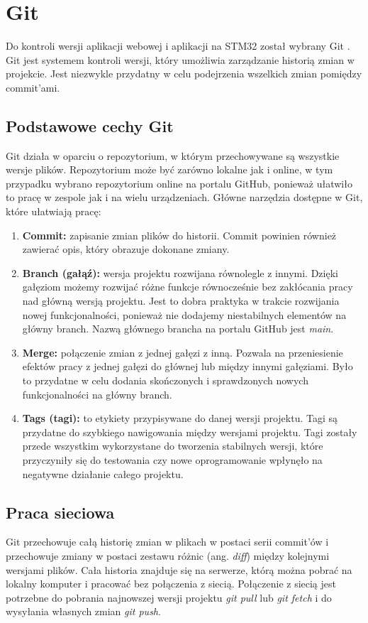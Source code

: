 \section{Git}
Do kontroli wersji aplikacji webowej i aplikacji na STM32 został wybrany Git \cite{Git}. Git jest systemem kontroli wersji, który umożliwia zarządzanie historią zmian w projekcie. Jest niezwykle przydatny w celu podejrzenia wszelkich zmian pomiędzy commit'ami.
\subsection{Podstawowe cechy Git}
Git działa w oparciu o repozytorium, w którym przechowywane są wszystkie wersje plików. Repozytorium może być zarówno lokalne jak i online, w tym przypadku wybrano repozytorium online na portalu GitHub, ponieważ ułatwiło to pracę w zespole jak i na wielu urządzeniach. Główne narzędzia dostępne w Git, które ułatwiają pracę:
\begin{enumerate}
    \item \textbf{Commit:} zapisanie zmian plików do historii. Commit powinien również zawierać opis, który obrazuje dokonane zmiany.
    \item \textbf{Branch (gałąź):} wersja projektu rozwijana równolegle z innymi. Dzięki gałęziom możemy rozwijać różne funkcje równocześnie bez zakłócania pracy nad główną wersją projektu. Jest to dobra praktyka w trakcie rozwijania nowej funkcjonalności, ponieważ nie dodajemy niestabilnych elementów na główny branch. Nazwą głównego brancha na portalu GitHub jest \textit{main}.
    \item \textbf{Merge:} połączenie zmian z jednej gałęzi z inną. Pozwala na przeniesienie efektów pracy z jednej gałęzi do głównej lub między innymi gałęziami. Było to przydatne w celu dodania 
 skończonych i sprawdzonych nowych funkcjonalności na główny branch.
    \item \textbf{Tags (tagi):} to etykiety przypisywane do danej wersji projektu. Tagi są przydatne do szybkiego nawigowania między wersjami projektu. Tagi zostały przede wszystkim wykorzystane do tworzenia stabilnych wersji, które przyczyniły się do testowania czy nowe oprogramowanie wpłynęło na negatywne działanie całego projektu.
\end{enumerate}
\subsection{Praca sieciowa}
Git przechowuje całą historię zmian w plikach w postaci serii commit'ów i przechowuje zmiany w postaci zestawu różnic (ang. \textit{diff}) między kolejnymi wersjami plików. Cała historia znajduje się na serwerze, którą można pobrać na lokalny komputer i pracować bez połączenia z siecią. Połączenie z siecią jest potrzebne do pobrania najnowszej wersji projektu \textit{git pull} lub \textit{git fetch} i do wysyłania własnych zmian \textit{git push}.
